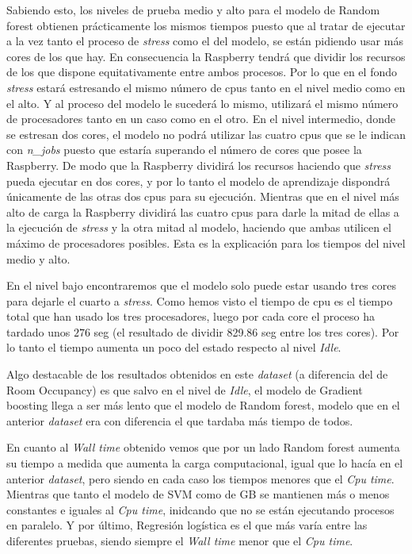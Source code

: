 \documentclass[a4paper, 12pt]{book}
\begin{document}
Sabiendo esto, los niveles de prueba medio y alto para el modelo de Random forest obtienen prácticamente los mismos tiempos puesto que al tratar de ejecutar a la vez tanto el proceso de \textit{stress} como el del modelo, se están pidiendo usar más cores de los que hay. En consecuencia la Raspberry tendrá que dividir los recursos de los que dispone equitativamente entre ambos procesos. Por lo que en el fondo \textit{stress} estará estresando el mismo número de cpus tanto en el nivel medio como en el alto. Y al proceso del modelo le sucederá lo mismo, utilizará el mismo número de procesadores tanto en un caso como en el otro. En el nivel intermedio, donde se estresan dos cores, el modelo no podrá utilizar las cuatro cpus que se le indican con \textit{n\_jobs} puesto que estaría superando el número de cores que posee la Raspberry. De modo que la Raspberry dividirá los recursos haciendo que \textit{stress} pueda ejecutar en dos cores, y por lo tanto el modelo de aprendizaje dispondrá únicamente de las otras dos cpus para su ejecución. Mientras que en el nivel más alto de carga la Raspberry dividirá las cuatro cpus para darle la mitad de ellas a la ejecución de \textit{stress} y la otra mitad al modelo, haciendo que ambas utilicen el máximo de procesadores posibles. Esta es la explicación para los tiempos del nivel medio y alto. 

En el nivel bajo encontraremos que el modelo solo puede estar usando tres cores para dejarle el cuarto a \textit{stress}. Como hemos visto el tiempo de cpu es el tiempo total que han usado los tres procesadores, luego por cada core el proceso ha tardado unos $276$ seg (el resultado de dividir 829.86 seg entre los tres cores). Por lo tanto el tiempo aumenta un poco del estado respecto al nivel \textit{Idle}.

Algo destacable de los resultados obtenidos en este \textit{dataset} (a diferencia del de Room Occupancy) es que salvo en el nivel de \textit{Idle}, el modelo de Gradient boosting llega a ser más lento que el modelo de Random forest, modelo que en el anterior \textit{dataset} era con diferencia el que tardaba más tiempo de todos.

En cuanto al \textit{Wall time} obtenido vemos que por un lado Random forest aumenta su tiempo a medida que aumenta la carga computacional, igual que lo hacía en el anterior \textit{dataset}, pero siendo en cada caso los tiempos menores que el \textit{Cpu time}. Mientras que tanto el modelo de SVM como de GB se mantienen más o menos constantes e iguales al \textit{Cpu time}, inidcando que no se están ejecutando procesos en paralelo. Y por último, Regresión logística es el que más varía entre las diferentes pruebas, siendo siempre el \textit{Wall time} menor que el \textit{Cpu time}.
\end{document}
